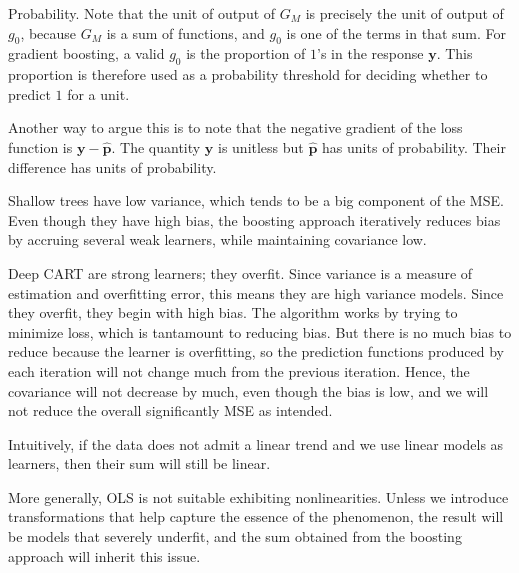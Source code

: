 \documentclass[12pt]{article}
\begin{document}
\begin{enumerate}

Probability. Note that the unit of output of $G_M$ is precisely the unit of output
of $g_0$, because $G_M$ is a sum of functions, and $g_0$ is one of the terms in
that sum. For gradient boosting, a valid $g_0$ is the proportion of $1$'s in the
response $\bm{y}$. This proportion is therefore used as a probability threshold
for deciding whether to predict $1$ for a unit.

Another way to argue this is to note that the negative gradient of the loss function
is $\bm{y} - \hat{\bm{p}}$. The quantity $\bm{y}$ is unitless but $\hat{\bm{p}}$
has units of probability. Their difference has units of probability.



Shallow trees have low variance, which tends to be a big component of the MSE.
Even though they have high bias, the boosting approach iteratively reduces bias
by accruing several weak learners, while maintaining covariance low.


Deep CART are strong learners; they overfit. Since variance is a measure of estimation
and overfitting error, this means they are high variance models. Since they overfit,
they begin with high bias. The algorithm works by trying to minimize loss, which is
tantamount to reducing bias. But there is no much bias to reduce because the
learner is overfitting, so the prediction functions produced by each iteration
will not change much from the previous iteration. Hence, the covariance will not
decrease by much, even though the bias is low, and we will not reduce the overall
significantly MSE as intended.


Intuitively, if the data does not admit a linear trend and we use linear models as learners,
then their sum will still be linear.

More generally, OLS is not suitable exhibiting nonlinearities. Unless we introduce
transformations that help capture the essence of the phenomenon, the result will
be models that severely underfit, and the sum obtained from the boosting approach
will inherit this issue.


\end{enumerate}
\end{document}
